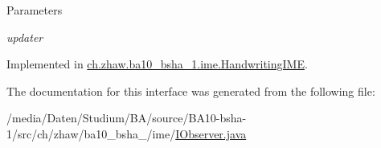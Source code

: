 \begin{DoxyParams}{Parameters}
\item[{\em updater}]\end{DoxyParams}


Implemented in \hyperlink{classch_1_1zhaw_1_1ba10__bsha__1_1_1ime_1_1HandwritingIME_a788cf4563e1480f6c3ea3ca6f07b2623}{ch.zhaw.ba10\_\-bsha\_\-1.ime.HandwritingIME}.

The documentation for this interface was generated from the following file:\begin{DoxyCompactItemize}
\item 
/media/Daten/Studium/BA/source/BA10-\/bsha-\/1/src/ch/zhaw/ba10\_\-bsha\_/ime/\hyperlink{IObserver_8java}{IObserver.java}\end{DoxyCompactItemize}

